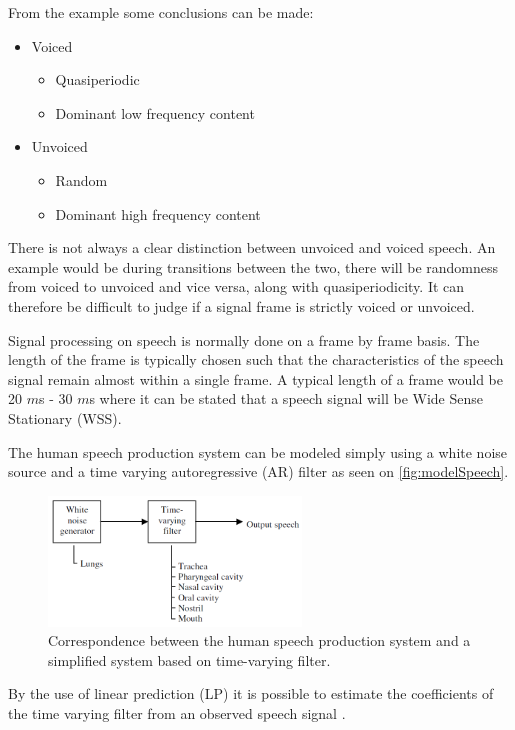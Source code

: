 \newpage

From the example some conclusions can be made:
\begin{itemize}
\item Voiced
	\begin{itemize}
	\item Quasiperiodic
	\item Dominant low frequency content
	\end{itemize}
\item Unvoiced
	\begin{itemize}
	\item Random 
	\item Dominant high frequency content
	\end{itemize}
\end{itemize}


There is not always a clear distinction between unvoiced and voiced speech. An example would be during transitions between the two, there will be randomness from voiced to unvoiced and vice versa, along with quasiperiodicity. It can therefore be difficult to judge if a signal frame is strictly voiced or unvoiced. 

Signal processing on speech is normally done on a frame by frame basis. The length of the frame is typically chosen such that the characteristics of the speech signal remain almost within a single frame. A typical length of a frame would be 20 $m$s - 30 $m$s where it can be stated that a speech signal will be Wide Sense Stationary (WSS).  

The human speech production system can be modeled simply using a white noise source and a time varying autoregressive (AR) filter as seen on \autoref{fig:modelSpeech}. 

\begin{figure}[H]
	\centering
	\includegraphics[width=0.6\textwidth]{figures/Speech/modelSpeech}
	\caption{Correspondence between the human speech production system and a simplified system based on time-varying filter.}
	\label{fig:modelSpeech}
\end{figure}      

By the use of linear prediction (LP) it is possible to estimate the coefficients of the time varying filter from an observed speech signal 
\citep{Speech}.


